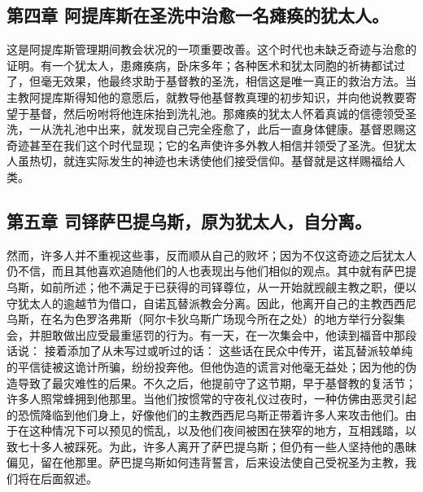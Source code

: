 
\subsection{第四章 阿提库斯在圣洗中治愈一名瘫痪的犹太人。}

这是阿提库斯管理期间教会状况的一项重要改善。这个时代也未缺乏奇迹与治愈的证明。有一个犹太人，患瘫痪病，卧床多年；各种医术和犹太同胞的祈祷都试过了，但毫无效果，他最终求助于基督教的圣洗，相信这是唯一真正的救治方法。当主教阿提库斯得知他的意愿后，就教导他基督教真理的初步知识，并向他说教要寄望于基督，然后吩咐将他连床抬到洗礼池。那瘫痪的犹太人怀着真诚的信德领受圣洗，一从洗礼池中出来，就发现自己完全痊愈了，此后一直身体健康。基督恩赐这奇迹甚至在我们这个时代显现；它的名声使许多外教人相信并领受了圣洗。但犹太人虽热切，就连实际发生的神迹也未诱使他们接受信仰。基督就是这样赐福给人类。\par


\subsection{第五章 司铎萨巴提乌斯，原为犹太人，自分离。}

然而，许多人并不重视这些事，反而顺从自己的败坏；因为不仅这奇迹之后犹太人仍不信，而且其他喜欢追随他们的人也表现出与他们相似的观点。其中就有萨巴提乌斯，如前所述；他不满足于已获得的司铎尊位，从一开始就觊觎主教之职，便以守犹太人的逾越节为借口，自诺瓦替派教会分离。因此，他离开自己的主教西西尼乌斯，在名为色罗洛弗斯（阿尔卡狄乌斯广场现今所在之处）的地方举行分裂集会，并胆敢做出应受最重惩罚的行为。有一天，在一次集会中，他读到福音中那段话说： 接着添加了从未写过或听过的话： 这些话在民众中传开，诺瓦替派较单纯的平信徒被这诡计所骗，纷纷投奔他。但他伪造的谎言对他毫无益处；因为他的伪造导致了最灾难性的后果。不久之后，他提前守了这节期，早于基督教的复活节；许多人照常蜂拥到他那里。当他们按惯常的守夜礼仪过夜时，一种仿佛由恶灵引起的恐慌降临到他们身上，好像他们的主教西西尼乌斯正带着许多人来攻击他们。由于在这种情况下可以预见的慌乱，以及他们夜间被困在狭窄的地方，互相践踏，以致七十多人被踩死。为此，许多人离开了萨巴提乌斯；但仍有一些人坚持他的愚昧偏见，留在他那里。萨巴提乌斯如何违背誓言，后来设法使自己受祝圣为主教，我们将在后面叙述。\par

